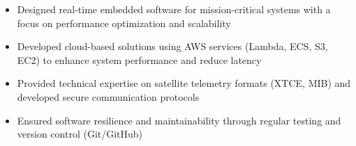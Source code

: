 \par\smallskip
\begin{minipage}{13.75cm}
  \begin{minipage}{6.5cm}
    \begin{itemize}
      \item Designed real-time embedded software for mission-critical systems with a focus on performance optimization and scalability
      \item Developed cloud-based solutions using AWS services (Lambda, ECS, S3, EC2) to enhance system performance and reduce latency
    \end{itemize}
  \end{minipage}
  \hfill
  \begin{minipage}{6.5cm}
    \begin{itemize}
      \item Provided technical expertise on satellite telemetry formats (XTCE, MIB) and developed secure communication protocols
      \item Ensured software resilience and maintainability through regular testing and version control (Git/GitHub)
    \end{itemize}
  \end{minipage}
\end{minipage}
\par\smallskip
\divider

